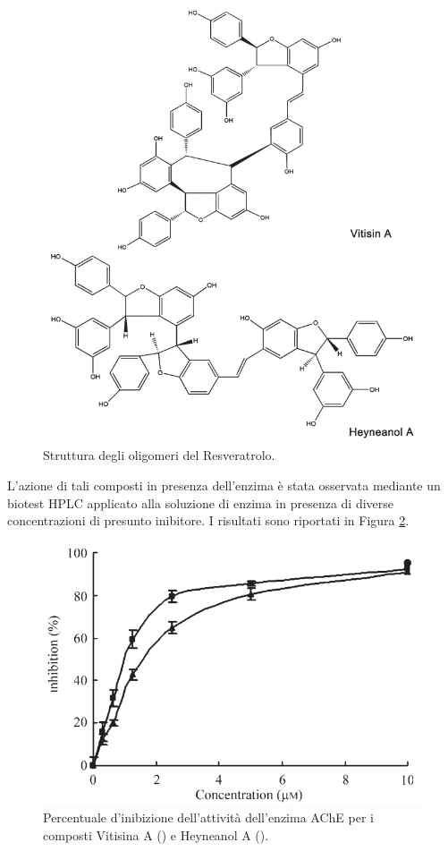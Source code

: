 \documentclass[a4paper, 12pt]{article}
\begin{document}
\begin{figure}[H]
	\centering
	\includegraphics[width=\linewidth]{immagini/oly_resveratrolo.png}
	\caption{Struttura degli oligomeri del Resveratrolo.}
	\label{fig:oly_resveratrolo}
\end{figure}

L'azione di tali composti in presenza dell'enzima è stata osservata mediante un biotest HPLC applicato alla soluzione di enzima in presenza di diverse concentrazioni di presunto inibitore. I risultati sono riportati in Figura \ref{fig:ris_resveratrolo}. \cite{jang_inhibition_2008}

\begin{figure}[H]
	\centering
	\includegraphics[width=.9\linewidth]{immagini/ris_resveratrolo.png}
	\caption{Percentuale d'inibizione dell'attività dell'enzima AChE per i composti Vitisina A () e Heyneanol A (). }
	\label{fig:ris_resveratrolo}
\end{figure}
\end{document}

